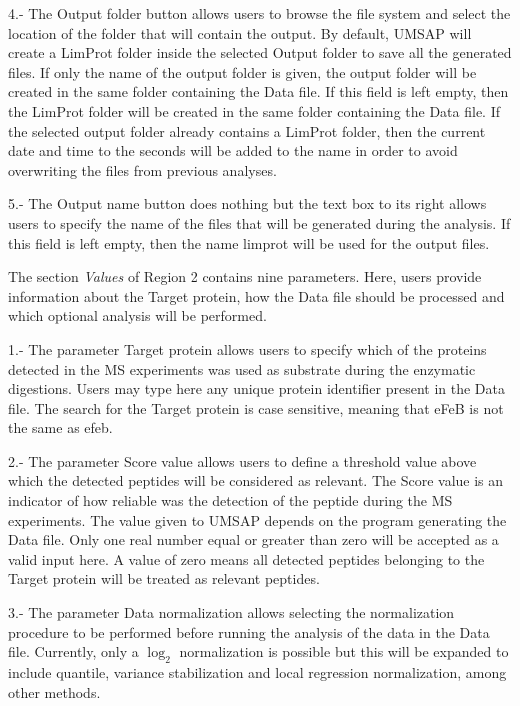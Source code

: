 \num{4}.- The Output folder\label{par:limprotOutFolder} button allows users to browse the file system and select the location of the folder that will contain the output. By default, UMSAP will create a LimProt folder inside the selected Output folder to save all the generated files. If only the name of the output folder is given, the output folder will be created in the same folder containing the Data file. If this field is left empty, then the LimProt folder will be created in the same folder containing the Data file. If the selected output folder already contains a LimProt folder, then the current date and time to the seconds will be added to the name in order to avoid overwriting the files from previous analyses.

\num{5}.- The Output name button does nothing but the text box to its right allows users to specify the name of the files that will be generated during the analysis. If this field is left empty, then the name limprot will be used for the output files. 

The section \textit{Values} of Region \num{2} contains nine parameters. Here, users provide information about the Target protein, how the Data file should be processed and which optional analysis will be performed.

\num{1}.- The parameter Target protein\label{par:limprotTargetProtein} allows users to specify which of the proteins detected in the MS experiments was used as substrate during the enzymatic digestions. Users may type here any unique protein identifier present in the Data file. The search for the Target protein is case sensitive, meaning that eFeB is not the same as efeb.

\num{2}.- The parameter Score value\label{par:limprotScoreValue} allows users to define a threshold value above which the detected peptides will be considered as relevant. The Score value is an indicator of how reliable was the detection of the peptide during the MS experiments. The value given to UMSAP depends on the program generating the Data file. Only one real number equal or greater than zero will be accepted as a valid input here. A value of zero means all detected peptides belonging to the Target protein will be treated as relevant peptides.

\num{3}.- The parameter Data normalization allows selecting the normalization procedure to be performed before running the analysis of the data in the Data file. Currently, only a $\log_2$ normalization is possible but this will be expanded to include quantile, variance stabilization and local regression normalization, among other methods. 


